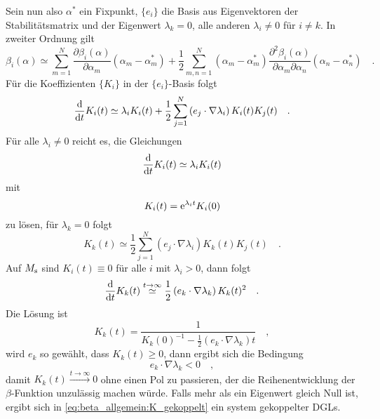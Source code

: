     Sein nun also $\alpha^*$ ein Fixpunkt, $\{e_i\}$ die Basis aus Eigenvektoren der 
    Stabilitätsmatrix und der Eigenwert $\lambda_k=0$, alle anderen $\lambda_i \neq 0$ 
    für $i\neq k$. In zweiter Ordnung gilt
    \begin{equation}
     \beta_i(\alpha) \simeq \sum\limits_{m=1}^N \frac{\partial \beta_i(\alpha)}{\partial
     \alpha_m} \left(\alpha_m-\alpha^*_m\right) + \frac12 \sum\limits_{m,n=1}^N 
      \left(\alpha_m-\alpha^*_m\right)
     \frac{\partial^2 \beta_i(\alpha)}{\partial\alpha_m \partial\alpha_n}
     \left(\alpha_n-\alpha^*_n\right) \quad .
    \end{equation}
    Für die Koeffizienten $\{K_i\}$ in der $\{e_i\}$-Basis folgt
    \begin{equation}
     \frac{\text{d}}{\text{d} t} K_i(t) \simeq \lambda_i K_i(t) + \frac12
     \sum\limits_{j=1}^N \left( e_j\cdot \nabla \lambda_i \right) K_i(t)K_j(t) \quad .
    \end{equation}
    Für alle $\lambda_i \neq 0 $ reicht es, die Gleichungen
    \begin{equation}
     \frac{\text{d}}{\text{d} t} K_i(t) \simeq \lambda_i K_i(t)
    \end{equation}
    mit
    \begin{equation}
     K_i(t) = \text{e}^{\lambda_i t} K_i(0)
    \end{equation}
    zu lösen, für $\lambda_k=0$ folgt 
    \begin{equation}
     K_k(t) \simeq \frac12 \sum\limits_{j=1}^N \left( e_j\cdot \nabla \lambda_i 
     \right) K_k(t)K_j(t) \quad . \label{eq:beta_allgemein:K_gekoppelt}
    \end{equation}
    Auf $M_\text{s}$ sind $K_i(t)\equiv 0$ für alle $i$ mit $\lambda_i > 0$, dann folgt
    \begin{equation}
     \frac{\text{d}}{\text{d} t} K_k(t) \overset{t\to\infty}{\simeq} \frac12 \left( e_k \cdot 
     \nabla\lambda_k \right) K_k(t)^2 \quad .
    \end{equation}
    Die Lösung ist
    \begin{equation}
     K_k(t) = \frac{1}{K_k(0)^{-1} - \frac12 \left( e_k\cdot \nabla \lambda_k \right) t } \quad ,
    \end{equation}
    wird $e_k$ so gewählt, dass $K_k(t)\geq 0$, dann ergibt sich die Bedingung
    \begin{equation}
     e_k \cdot \nabla\lambda_k < 0 \quad , \label{eq:beta_allgemein:lambda0_bedingung} 
    \end{equation}
    damit $K_k(t)\overset{t\to\infty}{\longrightarrow}0$ ohne einen Pol zu passieren, der die 
    Reihenentwicklung der $\beta$-Funktion unzulässig machen würde. Falls mehr als ein 
    Eigenwert gleich Null ist, ergibt sich in \eqref{eq:beta_allgemein:K_gekoppelt} ein 
    system gekoppelter DGLs.

